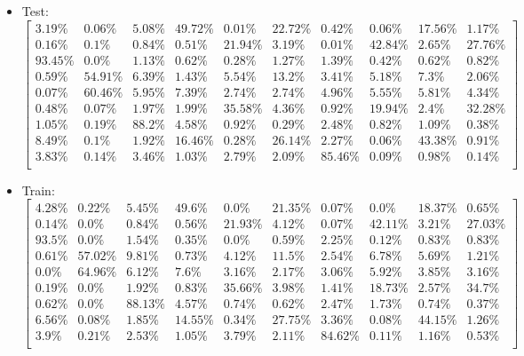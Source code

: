 \documentclass[a4paper,14pt]{report}
\begin{document}
	\begin{itemize}
		\item Test:
		$
		\begin{bmatrix}
		3.19\% & 0.06\% & 5.08\% & 49.72\% & 0.01\% & 22.72\% & 0.42\% & 0.06\% & 17.56\% & 1.17\% \\ 
		0.16\% & 0.1\% & 0.84\% & 0.51\% & 21.94\% & 3.19\% & 0.01\% & 42.84\% & 2.65\% & 27.76\% \\ 
		93.45\% & 0.0\% & 1.13\% & 0.62\% & 0.28\% & 1.27\% & 1.39\% & 0.42\% & 0.62\% & 0.82\% \\ 
		0.59\% & 54.91\% & 6.39\% & 1.43\% & 5.54\% & 13.2\% & 3.41\% & 5.18\% & 7.3\% & 2.06\% \\
		0.07\% & 60.46\% & 5.95\% & 7.39\% & 2.74\% & 2.74\% & 4.96\% & 5.55\% & 5.81\% & 4.34\% \\ 
		0.48\% & 0.07\% & 1.97\% & 1.99\% & 35.58\% & 4.36\% & 0.92\% & 19.94\% & 2.4\% & 32.28\% \\ 
		1.05\% & 0.19\% & 88.2\% & 4.58\% & 0.92\% & 0.29\% & 2.48\% & 0.82\% & 1.09\% & 0.38\% \\ 
		8.49\% & 0.1\% & 1.92\% & 16.46\% & 0.28\% & 26.14\% & 2.27\% & 0.06\% & 43.38\% & 0.91\% \\ 
		3.83\% & 0.14\% & 3.46\% & 1.03\% & 2.79\% & 2.09\% & 85.46\% & 0.09\% & 0.98\% & 0.14\% \\
		\end{bmatrix} 
		$
		\item Train:
		$
		\begin{bmatrix}
		4.28\% & 0.22\% & 5.45\% & 49.6\% & 0.0\% & 21.35\% & 0.07\% & 0.0\% & 18.37\% & 0.65\% \\ 
		0.14\% & 0.0\% & 0.84\% & 0.56\% & 21.93\% & 4.12\% & 0.07\% & 42.11\% & 3.21\% & 27.03\% \\ 
		93.5\% & 0.0\% & 1.54\% & 0.35\% & 0.0\% & 0.59\% & 2.25\% & 0.12\% & 0.83\% & 0.83\% \\ 
		0.61\% & 57.02\% & 9.81\% & 0.73\% & 4.12\% & 11.5\% & 2.54\% & 6.78\% & 5.69\% & 1.21\% \\ 
		0.0\% & 64.96\% & 6.12\% & 7.6\% & 3.16\% & 2.17\% & 3.06\% & 5.92\% & 3.85\% & 3.16\% \\ 
		0.19\% & 0.0\% & 1.92\% & 0.83\% & 35.66\% & 3.98\% & 1.41\% & 18.73\% & 2.57\% & 34.7\% \\ 
		0.62\% & 0.0\% & 88.13\% & 4.57\% & 0.74\% & 0.62\% & 2.47\% & 1.73\% & 0.74\% & 0.37\% \\ 
		6.56\% & 0.08\% & 1.85\% & 14.55\% & 0.34\% & 27.75\% & 3.36\% & 0.08\% & 44.15\% & 1.26\% \\ 
		3.9\% & 0.21\% & 2.53\% & 1.05\% & 3.79\% & 2.11\% & 84.62\% & 0.11\% & 1.16\% & 0.53\% \\
		\end{bmatrix} 
		$
	\end{itemize}
\end{document}
